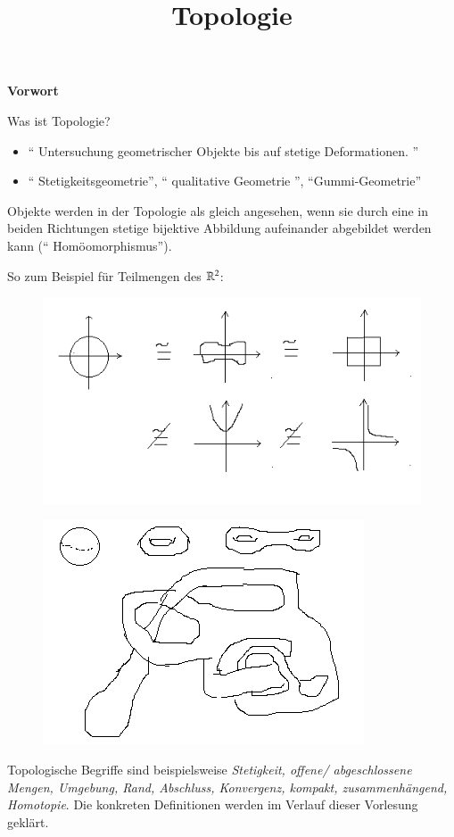 \documentclass[a4paper,10pt]{scrartcl}
\title{Topologie}
\begin{document}
\maketitle

\tableofcontents
\newpage
\begin{center}
\LARGE\textbf{Vorwort}
\end{center}
\begin{seg}{Was ist Topologie?}
\begin{itemize}
\item "` Untersuchung geometrischer Objekte bis auf stetige Deformationen. "'
\item "` Stetigkeitsgeometrie"', "` qualitative Geometrie "', "`Gummi-Geometrie"'
\end{itemize}
Objekte werden in der Topologie als gleich angesehen, wenn sie durch eine in beiden Richtungen stetige bijektive Abbildung aufeinander abgebildet werden kann ("` Homöomorphismus"').
\end{seg}
So zum Beispiel für Teilmengen des $\mathbb{R}^2$:
\begin{figure}[h]
\centering
\includegraphics[scale=0.7]{fig1.png}
\caption{}
\end{figure}
\begin{ex*}
\begin{figure}[H]
 \centering
\includegraphics[scale=0.7]{fig2.png}
\caption{}
\end{figure}
Topologische Begriffe sind beispielsweise \emph{Stetigkeit, offene/ abgeschlossene Mengen, Umgebung, Rand, Abschluss, Konvergenz, kompakt, zusammenhängend, Homotopie}.  Die konkreten Definitionen werden im Verlauf dieser Vorlesung geklärt.
\end{ex*}
\end{document}
